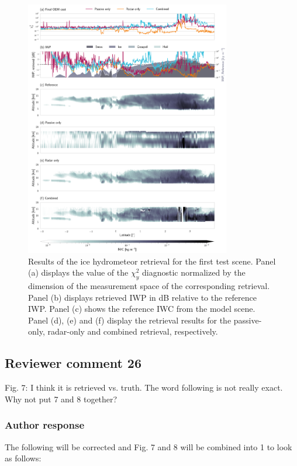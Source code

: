 \documentclass[11pt]{scrartcl}
\begin{document}
\begin{figure}
\centering
\includegraphics[width = 0.8\textwidth]{../plots/results_a_LargePlateAggregate.png}
\caption{Results of the ice hydrometeor retrieval for the first test scene.
  Panel (a) displays the value of the $\chi^2_y$ diagnostic normalized by the
  dimension of the measurement space of the corresponding retrieval. Panel (b)
  displays retrieved IWP in dB relative to the reference IWP. Panel (c) shows
  the reference IWC from the model scene. Panel (d), (e) and (f) display the
  retrieval results for the passive-only, radar-only and combined retrieval,
  respectively.}
\label{fig:results_a}
\end{figure}


\subsection*{Reviewer comment 26}
Fig.  7:  I think it is retrieved vs.  truth.  The word following is not really exact.  Why not put 7 and 8 together?

\subsubsection*{Author response}

The following will be corrected and Fig. 7 and 8 will be combined into 1 to look as follows:
\end{document}
